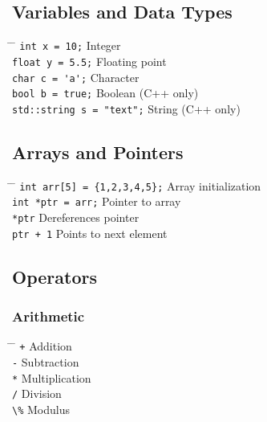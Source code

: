 \documentclass[a4paper,10pt]{article}
\begin{document}
\subsection{Variables and Data Types}
\begin{tabbing}
	\= \hspace{30mm} \= \hspace{50mm} \kill
	\> \verb|int x = 10;| \> Integer \\
	\> \verb|float y = 5.5;| \> Floating point \\
	\> \verb|char c = 'a';| \> Character \\
	\> \verb|bool b = true;| \> Boolean (C++ only) \\
	\> \verb|std::string s = "text";| \> String (C++ only) \\
\end{tabbing}

\subsection{Arrays and Pointers}
\begin{tabbing}
	\= \hspace{30mm} \= \hspace{50mm} \kill
	\> \verb|int arr[5] = {1,2,3,4,5};| \> Array initialization \\
	\> \verb|int *ptr = arr;| \> Pointer to array \\
	\> \verb|*ptr| \> Dereferences pointer \\
	\> \verb|ptr + 1| \> Points to next element \\
\end{tabbing}

\subsection{Operators}
\subsubsection*{Arithmetic}
\begin{tabbing}
	\= \hspace{30mm} \= \hspace{50mm} \kill
	\> \verb|+| \> Addition \\
	\> \verb|-| \> Subtraction \\
	\> \verb|*| \> Multiplication \\
	\> \verb|/| \> Division \\
	\> \verb|\%| \> Modulus \\
\end{tabbing}
\end{document}
